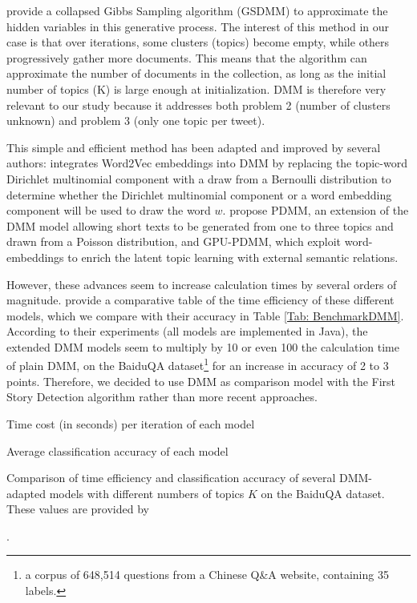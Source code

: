 \citet{yin_dirichlet_2014} provide a collapsed Gibbs Sampling algorithm (GSDMM) to approximate the hidden variables in this generative process. The interest of this method in our case is that over iterations, some clusters (topics) become empty, while others progressively gather more documents. This means that the algorithm can approximate the number of documents in the collection, as long as the initial number of topics (K) is large enough at initialization. DMM is therefore very relevant to our study because it addresses both problem 2 (number of clusters unknown) and problem 3 (only one topic per tweet).

This simple and efficient method has been adapted and improved by several authors:
\citet{nguyen2015improving} integrates Word2Vec embeddings into DMM by replacing the topic-word Dirichlet multinomial component with a draw from a Bernoulli distribution to determine whether the Dirichlet multinomial component or a word embedding component will be used to draw the word $w$. \citet{li_enhancing_2017} propose PDMM, an extension of the DMM model allowing short texts to be generated from one to three topics and drawn from a Poisson distribution, and GPU-PDMM, which exploit word-embeddings to enrich the latent topic learning with external semantic relations. 

However, these advances seem to increase calculation times by several orders of magnitude. \citet{li_enhancing_2017} provide a comparative table of the time efficiency of these different models, which we compare with their accuracy in Table \ref{Tab: BenchmarkDMM}. According to their experiments (all models are implemented in Java), the extended DMM models seem to multiply by 10 or even 100 the calculation time of plain DMM, on the BaiduQA dataset\footnote{a corpus of 648,514 questions from a Chinese Q\&A website, containing 35 labels.} for an increase in accuracy of 2 to 3 points. Therefore, we decided to use DMM as comparison model with the First Story Detection algorithm rather than more recent approaches.


\begin{table}[ht]
\centering
\begin{subtable}{.5\textwidth}
  \centering
  
  \caption{Time cost (in seconds) per iteration of each model}
  \label{Tab: time_efficiency}
\end{subtable}%
\begin{subtable}{.5\textwidth}
  \centering
  
  \caption{Average classification accuracy of each model}
  \label{Tab: classification_accuracy}
\end{subtable}
\caption{Comparison of time efficiency and classification accuracy of several DMM-adapted models with different numbers of topics $K$ on the BaiduQA dataset. These values are provided by \citet{li_enhancing_2017}}.
\label{Tab: BenchmarkDMM}
\end{table}
 	 


